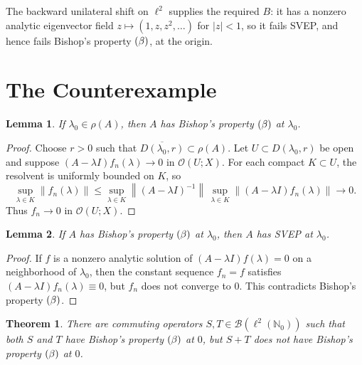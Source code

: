 \documentclass[11pt]{article}
\newtheorem{theorem}{Theorem}
\newtheorem{lemma}{Lemma}
\newcommand{\N}{\mathbb N}
\newcommand{\BB}{\mathcal B}
\newcommand{\norm}[1]{\left\lVert #1 \right\rVert}
\newcommand{\bprop}{\textup{(}\beta\textup{)}}
\begin{document}
The backward unilateral shift on \(\ell^2\) supplies the required \(B\): it has
a nonzero analytic eigenvector field \(z\mapsto(1,z,z^2,\ldots)\) for
\(|z|<1\), so it fails SVEP, and hence fails Bishop's property \(\bprop\), at
the origin.

\section*{The Counterexample}

\begin{lemma}\label{lem:resolvent}
If \(\lambda_0\in\rho(A)\), then \(A\) has Bishop's property \(\bprop\) at
\(\lambda_0\).
\end{lemma}

\begin{proof}
Choose \(r>0\) such that \(\overline{D(\lambda_0,r)}\subset\rho(A)\).  Let
\(U\subset D(\lambda_0,r)\) be open and suppose
\((A-\lambda I)f_n(\lambda)\to0\) in \(\mathcal O(U;X)\).  For each compact
\(K\subset U\), the resolvent is uniformly bounded on \(K\), so
\[
  \sup_{\lambda\in K}\norm{f_n(\lambda)}
  \le
  \sup_{\lambda\in K}\norm{(A-\lambda I)^{-1}}\,
  \sup_{\lambda\in K}\norm{(A-\lambda I)f_n(\lambda)}
  \longrightarrow 0.
\]
Thus \(f_n\to0\) in \(\mathcal O(U;X)\).
\end{proof}

\begin{lemma}\label{lem:beta-svep}
If \(A\) has Bishop's property \(\bprop\) at \(\lambda_0\), then \(A\) has
SVEP at \(\lambda_0\).
\end{lemma}

\begin{proof}
If \(f\) is a nonzero analytic solution of
\((A-\lambda I)f(\lambda)=0\) on a neighborhood of \(\lambda_0\), then the
constant sequence \(f_n=f\) satisfies
\((A-\lambda I)f_n(\lambda)\equiv0\), but \(f_n\) does not converge to \(0\).
This contradicts Bishop's property \(\bprop\).
\end{proof}

\begin{theorem}
There are commuting operators \(S,T\in\BB(\ell^2(\N_0))\) such that both \(S\)
and \(T\) have Bishop's property \(\bprop\) at \(0\), but \(S+T\) does not have
Bishop's property \(\bprop\) at \(0\).
\end{theorem}
\end{document}
